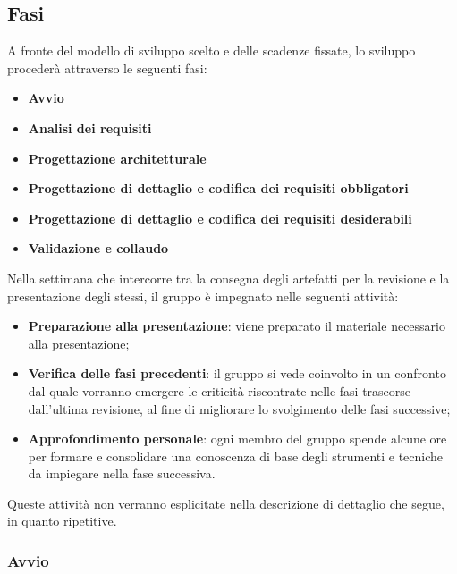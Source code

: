 \subsection{Fasi}

A fronte del modello di sviluppo scelto e delle scadenze fissate, lo sviluppo procederà attraverso le seguenti fasi:
\begin{itemize}
	\item \textbf{Avvio}
	\item \textbf{Analisi dei requisiti}
	\item \textbf{Progettazione architetturale}
	\item \textbf{Progettazione di dettaglio e codifica dei requisiti obbligatori}
	\item \textbf{Progettazione di dettaglio e codifica dei requisiti desiderabili}
	\item \textbf{Validazione e collaudo}
	

\end{itemize}
Nella settimana che intercorre tra la consegna degli artefatti per la revisione e la presentazione degli stessi, il gruppo è impegnato nelle seguenti attività: 
\begin{itemize}
	\item \textbf{Preparazione alla presentazione}: viene preparato il materiale necessario alla presentazione;
	\item \textbf{Verifica delle fasi precedenti}: il gruppo si vede coinvolto in un confronto dal quale vorranno emergere le criticità riscontrate nelle fasi trascorse dall'ultima revisione, al fine di migliorare lo svolgimento delle fasi successive;
	\item \textbf{Approfondimento personale}: ogni membro del gruppo spende alcune ore per formare e consolidare una conoscenza di base degli strumenti e tecniche da impiegare nella fase successiva.
\end{itemize}
Queste attività non verranno esplicitate nella descrizione di dettaglio che segue, in quanto ripetitive.



\subsubsection{Avvio}

